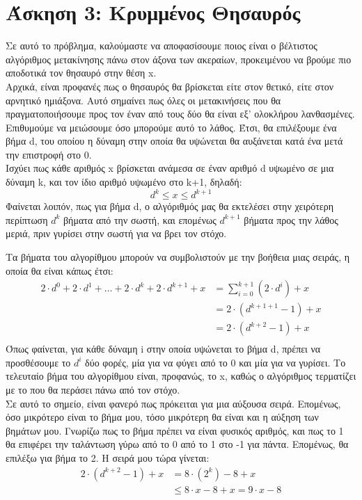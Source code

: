 \documentclass{article}
\begin{document}
\section*{\large Άσκηση 3: Κρυμμένος Θησαυρός}
Σε αυτό το πρόβλημα, καλούμαστε να αποφασίσουμε ποιος είναι ο βέλτιστος αλγόριθμος μετακίνησης πάνω στον άξονα των ακεραίων, προκειμένου να βρούμε πιο αποδοτικά τον θησαυρό στην θέση \textlatin{x}. 
\\ Αρχικά, είναι προφανές πως ο θησαυρός θα βρίσκεται είτε στον θετικό, είτε στον αρνητικό ημιάξονα. Αυτό σημαίνει πως όλες οι μετακινήσεις που θα πραγματοποιήσουμε προς τον έναν από τους δύο θα είναι εξ' ολοκλήρου λανθασμένες. 
\\ Επιθυμούμε να μειώσουμε όσο μπορούμε αυτό το λάθος. Έτσι, θα επιλέξουμε ένα βήμα \textlatin{d}, του οποίου η δύναμη στην οποία θα υψώνεται θα αυξάνεται κατά ένα μετά την επιστροφή στο 0.
\\ Ισχύει πως κάθε αριθμός \textlatin{x} βρίσκεται ανάμεσα σε έναν αριθμό \textlatin{d} υψωμένο σε μια δύναμη \textlatin{k}, και τον ίδιο αριθμό υψωμένο στο \textlatin{k+1}, δηλαδή: 
\[
d^k \leq x \leq d^{k+1}
\]
Φαίνεται λοιπόν, πως για βήμα \textlatin{d}, ο αλγόριθμός μας θα εκτελέσει στην χειρότερη περίπτωση $d^{k}$ βήματα από την σωστή, και επομένως $d^{k+1}$ βήματα προς την λάθος μεριά, πριν γυρίσει στην σωστή για να βρει τον στόχο. 

Τα βήματα του αλγορίθμου μπορούν να συμβολιστούν με την βοήθεια μιας σειράς, η οποία θα είναι κάπως έτσι:
\begin{align*}
2 \cdot d^0 + 2 \cdot d^1 + \ldots + 2 \cdot d^k + 2 \cdot d^{k+1} + x &= \sum_{i=0}^{k+1} (2 \cdot d^i) + x \\ 
&= 2 \cdot (d^{k+1+1} - 1) + x \\ 
&= 2 \cdot (d^{k+2} - 1) + x \\ 
\end{align*}
Όπως φαίνεται, για κάθε δύναμη \textlatin{i} στην οποία υψώνεται το βήμα \textlatin{d}, πρέπει να προσθέσουμε το $d^i$ δύο φορές, μία για να φύγει από το 0 και μία για να γυρίσει. Το τελευταίο βήμα του αλγορίθμου είναι, προφανώς, το \textlatin{x}, καθώς ο αλγόριθμος τερματίζει με το που θα περάσει πάνω από τον στόχο. \\ 
Σε αυτό το σημείο, είναι φανερό πως πρόκειται για μια αύξουσα σειρά. Επομένως, όσο μικρότερο είναι το βήμα μου, τόσο μικρότερη θα είναι και η αύξηση των βημάτων μου. Γνωρίζω πως το βήμα πρέπει να είναι φυσικός αριθμός, και πως το 1 θα επιφέρει την ταλάντωση γύρω από το 0 από το 1 στο -1 για πάντα. Επομένως, θα επιλέξω για βήμα το 2. 
Η σειρά μου τώρα γίνεται:
\begin{align*}
2 \cdot (d^{k+2} - 1) + x &= 8 \cdot (2^{k}) - 8 + x \\
&\leq 8 \cdot x - 8 + x = 9 \cdot x - 8
\end{align*}
\end{document}
